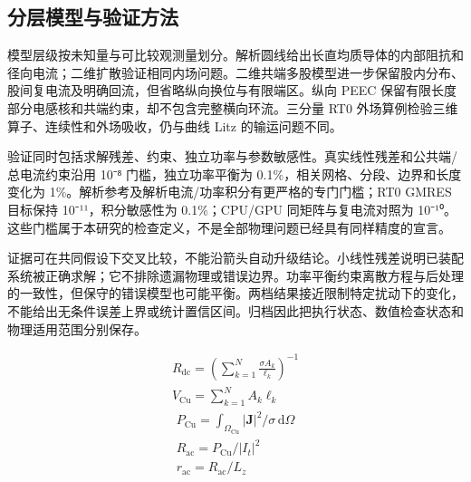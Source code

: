 \documentclass[journal,10pt]{IEEEtran}
\begin{document}
\subsection*{分层模型与验证方法}
\hypertarget{02.hierarchy.heading}{}
模型层级按未知量与可比较观测量划分。解析圆线给出长直均质导体的内部阻抗和径向电流；二维扩散验证相同内场问题。二维共端多股模型进一步保留股内分布、股间复电流及明确回流，但省略纵向换位与有限端区。纵向 PEEC 保留有限长度部分电感核和共端约束，却不包含完整横向环流。三分量 RT0 外场算例检验三维算子、连续性和外场吸收，仍与曲线 Litz 的输运问题不同。


验证同时包括求解残差、约束、独立功率与参数敏感性。真实线性残差和公共端/总电流约束沿用 10⁻⁸ 门槛，独立功率平衡为 0.1\%，相关网格、分段、边界和长度变化为 1\%。解析参考及解析电流/功率积分有更严格的专门门槛；RT0 GMRES 目标保持 10⁻¹¹，积分敏感性为 0.1\%；CPU/GPU 同矩阵与复电流对照为 10⁻¹⁰。这些门槛属于本研究的检查定义，不是全部物理问题已经具有同样精度的宣言。


证据可在共同假设下交叉比较，不能沿箭头自动升级结论。小线性残差说明已装配系统被正确求解；它不排除遗漏物理或错误边界。功率平衡约束离散方程与后处理的一致性，但保守的错误模型也可能平衡。两档结果接近限制特定扰动下的变化，不能给出无条件误差上界或统计置信区间。归档因此把执行状态、数值检查状态和物理适用范围分别保存。


\hypertarget{E01}{}
\begin{equation}
\begin{gathered}
R_{\mathrm{dc}}=\left(\sum_{k=1}^{N}\frac{\sigma A_k}{\ell_k}\right)^{-1} \\
V_{\mathrm{Cu}}=\sum_{k=1}^{N}A_k\ell_k
\end{gathered}
\tag{1}\label{eq:E01}
\end{equation}
\hypertarget{E02}{}
\begin{equation}
\begin{gathered}
P_{\mathrm{Cu}}=\int_{\Omega_{\mathrm{Cu}}}|\mathbf J|^2/\sigma\,\mathrm d\Omega \\
R_{\mathrm{ac}}=P_{\mathrm{Cu}}/|I_t|^2 \\
r_{\mathrm{ac}}=R_{\mathrm{ac}}/L_z
\end{gathered}
\tag{2}\label{eq:E02}
\end{equation}
\end{document}

